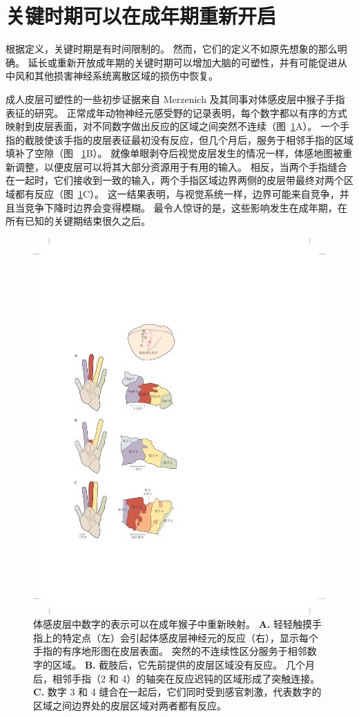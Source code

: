 \section{关键时期可以在成年期重新开启}

根据定义，关键时期是有时间限制的。
然而，它们的定义不如原先想象的那么明确。
延长或重新开放成年期的关键时期可以增加大脑的可塑性，并有可能促进从中风和其他损害神经系统离散区域的损伤中恢复。


成人皮层可塑性的一些初步证据来自 Merzenich 及其同事对体感皮层中猴子手指表征的研究。
正常成年动物神经元感受野的记录表明，每个数字都以有序的方式映射到皮层表面，对不同数字做出反应的区域之间突然不连续（图~\ref{fig:49_19}A）。
一个手指的截肢使该手指的皮层表征最初没有反应，但几个月后，服务于相邻手指的区域填补了空隙（图 ~\ref{fig:49_19}B）。
就像单眼剥夺后视觉皮层发生的情况一样，体感地图被重新调整，以便皮层可以将其大部分资源用于有用的输入。 相反，当两个手指缝合在一起时，它们接收到一致的输入，两个手指区域边界两侧的皮层带最终对两个区域都有反应（图~\ref{fig:49_19}C）。
这一结果表明，与视觉系统一样，边界可能来自竞争，并且当竞争下降时边界会变得模糊。
最令人惊讶的是，这些影响发生在成年期，在所有已知的关键期结束很久之后。


\begin{figure}[htbp]
	\centering
	\includegraphics[width=0.5\linewidth]{chap49/fig_49_19}
	\caption{体感皮层中数字的表示可以在成年猴子中重新映射\cite{merzenich1984somatosensory}。
		\textbf{A.} 轻轻触摸手指上的特定点（左）会引起体感皮层神经元的反应（右），显示每个手指的有序地形图在皮层表面。
		突然的不连续性区分服务于相邻数字的区域。
		\textbf{B.} 截肢后，它先前提供的皮层区域没有反应。
		几个月后，相邻手指（2 和 4）的轴突在反应迟钝的区域形成了突触连接。
		\textbf{C.} 数字 3 和 4 缝合在一起后，它们同时受到感官刺激，代表数字的区域之间边界处的皮层区域对两者都有反应。}
	\label{fig:49_19}
\end{figure}


